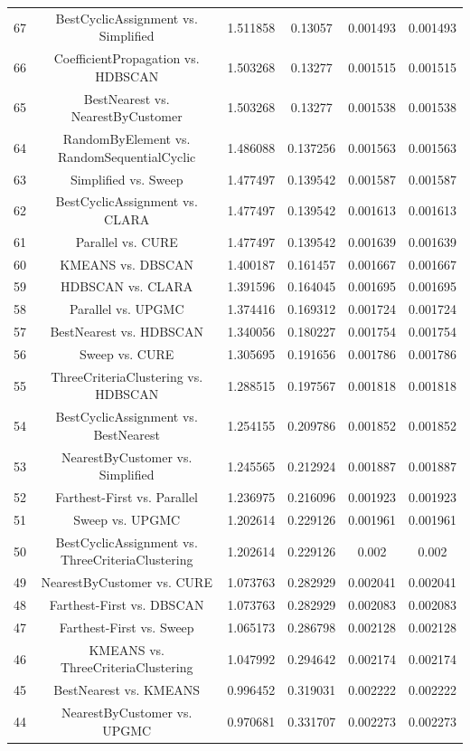 \documentclass[a4paper,10pt]{article}
\begin{document}
\begin{landscape}
\begin{table}[!htp]
\begin{tabular}{cccccc}
67&BestCyclicAssignment vs. Simplified&1.511858&0.13057&0.001493&0.001493\\
66&CoefficientPropagation vs. HDBSCAN&1.503268&0.13277&0.001515&0.001515\\
65&BestNearest vs. NearestByCustomer&1.503268&0.13277&0.001538&0.001538\\
64&RandomByElement vs. RandomSequentialCyclic&1.486088&0.137256&0.001563&0.001563\\
63&Simplified vs. Sweep&1.477497&0.139542&0.001587&0.001587\\
62&BestCyclicAssignment vs. CLARA&1.477497&0.139542&0.001613&0.001613\\
61&Parallel vs. CURE&1.477497&0.139542&0.001639&0.001639\\
60&KMEANS vs. DBSCAN&1.400187&0.161457&0.001667&0.001667\\
59&HDBSCAN vs. CLARA&1.391596&0.164045&0.001695&0.001695\\
58&Parallel vs. UPGMC&1.374416&0.169312&0.001724&0.001724\\
57&BestNearest vs. HDBSCAN&1.340056&0.180227&0.001754&0.001754\\
56&Sweep vs. CURE&1.305695&0.191656&0.001786&0.001786\\
55&ThreeCriteriaClustering vs. HDBSCAN&1.288515&0.197567&0.001818&0.001818\\
54&BestCyclicAssignment vs. BestNearest&1.254155&0.209786&0.001852&0.001852\\
53&NearestByCustomer vs. Simplified&1.245565&0.212924&0.001887&0.001887\\
52&Farthest-First vs. Parallel&1.236975&0.216096&0.001923&0.001923\\
51&Sweep vs. UPGMC&1.202614&0.229126&0.001961&0.001961\\
50&BestCyclicAssignment vs. ThreeCriteriaClustering&1.202614&0.229126&0.002&0.002\\
49&NearestByCustomer vs. CURE&1.073763&0.282929&0.002041&0.002041\\
48&Farthest-First vs. DBSCAN&1.073763&0.282929&0.002083&0.002083\\
47&Farthest-First vs. Sweep&1.065173&0.286798&0.002128&0.002128\\
46&KMEANS vs. ThreeCriteriaClustering&1.047992&0.294642&0.002174&0.002174\\
45&BestNearest vs. KMEANS&0.996452&0.319031&0.002222&0.002222\\
44&NearestByCustomer vs. UPGMC&0.970681&0.331707&0.002273&0.002273\\

\end{tabular}
\end{table}
\end{landscape}
\end{document}
